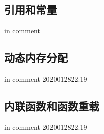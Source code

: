 \documentclass[UTF8]{article}
\begin{document}
\subsection{引用和常量}
in comment
\begin{comment}
const int MAX_VAL = 23;
const double Pi = 3.14;
const char * schol_name = "mit";

1）不能通过const指针修改其所指向的内容；
2）常量指针不能赋值给非常量指针，除非强制类型转换(int *),反过来可以。
3）函数中const能防止参数指针指向的地方的数据被修改
void MyPrintf( const char *p){
    strcpy(p," by QR");//编译应该会出错
    printf("%
}

\end{comment}

\subsection{动态内存分配}
in comment
2020012822:19
\begin{comment}

malloc库
P = new T;
T是任意类型名，P是T*的指针，是动态分配出sizeof(T)的内存空间的起始地址。
int *pnew;
pnew = new int;
*pnew = 5;
delete pnew;

P = new T[n];
n是元素个数或者整数表达式
int *p;
int n = 6;
pnew = new int[n * 20];
pnew[0] = 20;
pnew[100] = 30;//编译没问题，运行会数组越界。
delete []pnew;

int *pnew = new int;

delete pnew; // 释放。delete 跟的指针要是一片动态空间
不释放的空间在程序运行期间会一直占用。


int *pnew = new int; *pnew = 5; delete pnew;
int *p_ = new int[6]; *p_[0] = 6; delete [] p_;

\end{comment}



\subsection{内联函数和函数重载}
in comment
2020012822:19
\begin{comment}
减少函数调用的开销，把函数插入到调用语句处。exe文件大
inline int max(int a, int b){
    if (a>b) return a;
    return b;
}
小的函数，调用时和执行过程产生的开销差不多。
函数名相同， 参数个数和类型不同叫参数重载,c++可以名字相同参数类型不同就好
int max(int a, int b){...;}
int max(int a, int b, int c){...;}
int max(double a, double b){...;}
名字和参数表相同的函数即使返回值类型不同也是重定义是错误
\end{comment}
\end{document}
